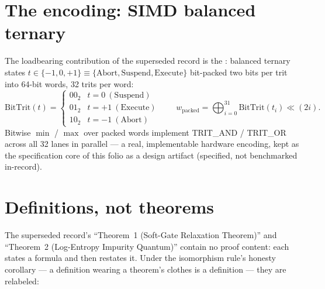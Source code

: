 \documentclass{alienfolio}
\begin{document}
\section{The encoding: SIMD balanced ternary}
\label{sec:encoding}

The loadbearing contribution of the superseded record is the
: balanced ternary states
$t \in \{-1, 0, +1\} \equiv \{\mathrm{Abort}, \mathrm{Suspend},
\mathrm{Execute}\}$ bit-packed two bits per trit into 64-bit words,
32 trits per word:
\begin{equation}
\mathrm{BitTrit}(t) = \left\{\begin{array}{ll}
00_2 & t = 0\ \mathrm{(Suspend)}\\
01_2 & t = +1\ \mathrm{(Execute)}\\
10_2 & t = -1\ \mathrm{(Abort)}
\end{array}\right.
\qquad
w_{\mathrm{packed}} = \bigoplus_{i=0}^{31}
\mathrm{BitTrit}(t_i) \ll (2i).
\end{equation}
Bitwise $\min$ / $\max$ over packed words implement TRIT\_AND /
TRIT\_OR across all 32 lanes in parallel --- a real, implementable
hardware encoding, kept as the specification core of this folio
 as a design artifact (specified, not benchmarked
in-record).

\section{Definitions, not theorems}
\label{sec:definitions}

The superseded record's ``Theorem~1 (Soft-Gate Relaxation Theorem)''
and ``Theorem~2 (Log-Entropy Impurity Quantum)'' contain no proof
content: each states a formula and then restates it. Under the
isomorphism rule's honesty corollary --- a definition wearing a
theorem's clothes is a definition --- they are relabeled:
\end{document}
